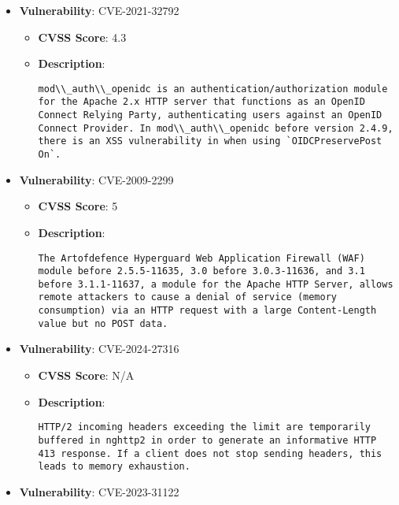 \documentclass{article}
\begin{document}
\begin{itemize}
        \item \textbf{Vulnerability}: CVE-2021-32792
        \begin{itemize}
            \item \textbf{CVSS Score}:  4.3 
            \item \textbf{Description}:
            \parbox[t]{0.9\linewidth}{
                \verb|mod\\_auth\\_openidc is an authentication/authorization module for the Apache 2.x HTTP server that functions as an OpenID Connect Relying Party, authenticating users against an OpenID Connect Provider. In mod\\_auth\\_openidc before version 2.4.9, there is an XSS vulnerability in when using `OIDCPreservePost On`.|
            }
        \end{itemize}
    
        \item \textbf{Vulnerability}: CVE-2009-2299
        \begin{itemize}
            \item \textbf{CVSS Score}:  5 
            \item \textbf{Description}:
            \parbox[t]{0.9\linewidth}{
                \verb|The Artofdefence Hyperguard Web Application Firewall (WAF) module before 2.5.5-11635, 3.0 before 3.0.3-11636, and 3.1 before 3.1.1-11637, a module for the Apache HTTP Server, allows remote attackers to cause a denial of service (memory consumption) via an HTTP request with a large Content-Length value but no POST data.|
            }
        \end{itemize}
    
        \item \textbf{Vulnerability}: CVE-2024-27316
        \begin{itemize}
            \item \textbf{CVSS Score}:  N/A 
            \item \textbf{Description}:
            \parbox[t]{0.9\linewidth}{
                \verb|HTTP/2 incoming headers exceeding the limit are temporarily buffered in nghttp2 in order to generate an informative HTTP 413 response. If a client does not stop sending headers, this leads to memory exhaustion.|
            }
        \end{itemize}
    
        \item \textbf{Vulnerability}: CVE-2023-31122
\end{itemize}
\end{document}
